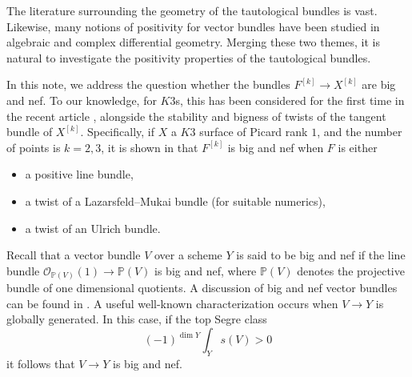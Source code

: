 \documentclass[pdftex]{sigma}
\numberwithin{equation}{section}
\begin{document}
The literature surrounding the geometry of the tautological bundles is vast. Likewise, many notions of positivity for vector bundles have been studied in algebraic and complex differential geometry. Merging these two themes, it is natural to investigate the positivity properties of the tautological bundles.

In this note, we address the question whether the bundles $F^{[k]}\to X^{[k]}$ are big and nef.
To our knowledge, for $K3$s, this has been considered for the first time in the recent article \cite{BBF}, alongside the stability and bigness of twists of the tangent bundle of $X^{[k]}$. Specifically, if $X$ a $K3$ surface of Picard rank $1$, and the number of points is $k=2, 3$, it is shown in \cite{BBF} that $F^{[k]}$ is big and nef when $F$ is either\vspace{-.5ex}
\begin{itemize}\itemsep=-1pt
\item [$(a)$] a positive line bundle,
\item [$(b)$] a twist of a Lazarsfeld--Mukai bundle (for suitable numerics),
\item [$(c)$] a twist of an Ulrich bundle.
\end{itemize}

Recall that a vector bundle $V$ over a scheme $Y$ is said to be big and nef if the line bundle $\mathcal O_{\mathbb P(V)}(1)\to \mathbb P(V)$ is big and nef, where $\mathbb P(V)$ denotes the projective bundle of one dimensional quotients. A discussion of big and nef vector bundles can be found in \cite[Chapters~6 and~7]{L-II}.
A useful well-known characterization occurs when $V\to Y$ is globally generated. In this case, if the top Segre class
\begin{equation}
\label{pos}(-1)^{\dim Y} \int_{Y} s(V)>0
\end{equation}
it follows that $V\to Y$ is big and nef.
\end{document}
